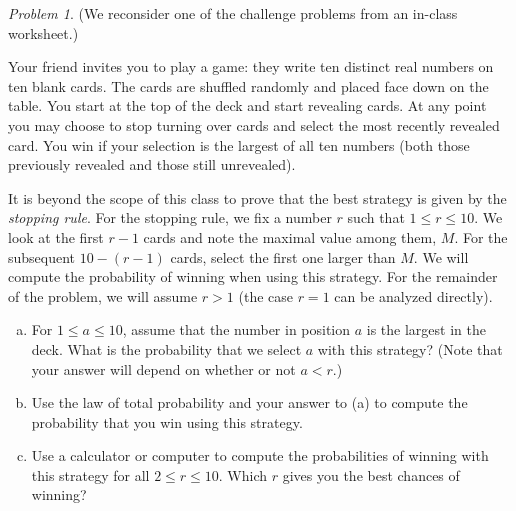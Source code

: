 \documentclass[11pt,twoside]{amsart}
\theoremstyle{plain}
\theoremstyle{remark}
\newtheorem{prob}{Problem}
\theoremstyle{definition}
\theoremstyle{definition}
\begin{document}
\begin{prob}
  (We reconsider one of the challenge problems from an in-class worksheet.)

 Your friend invites you to play a game: they write ten distinct real numbers on
ten blank cards.  The cards are shuffled randomly and placed face down on the
table.  You start at the top of the deck and start revealing cards.  At any
point you may choose to stop turning over cards and select the most recently
revealed card.  You win if your selection is the largest of all ten numbers
(both those previously revealed and those still unrevealed). 

It is beyond the scope of this class to prove that the best strategy is given by the \emph{stopping rule}. For the stopping rule, we fix a number $r$ such that $1\leq r \leq 10$. We look at the first $r-1$ cards and note the maximal value among them, $M$.  For the subsequent $10-(r-1)$ cards, select the first one larger than $M$. We will compute the probability of winning when using this strategy. For the remainder of the problem, we will assume $r>1$ (the case $r=1$ can be analyzed directly). 
\begin{enumerate}[(a)]
 \item For $1\leq a \leq 10$, assume that the number in position $a$ is the largest in the deck. What is the probability that we select $a$ with this strategy? (Note that your answer will depend on whether or not $a<r$.)
 \item Use the law of total probability and your answer to (a) to compute the probability that you win using this strategy.
 \item Use a calculator or computer to compute the probabilities of winning with this strategy for all $2\leq r \leq 10$. Which $r$ gives you the best chances of winning?
\end{enumerate}
\end{prob}
\end{document}
